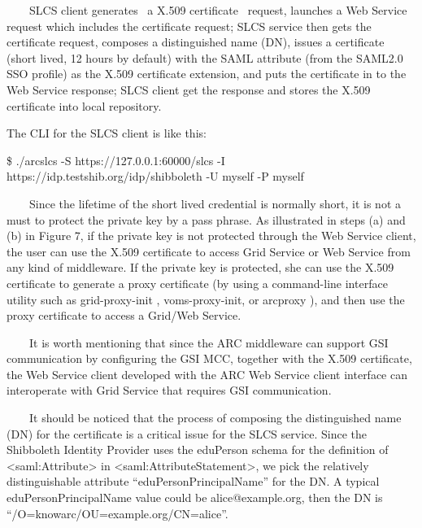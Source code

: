 \documentclass{article}
\newcounter{Figure}
\begin{document}
{\color{black}
\ \ \ \ SLCS client generates \ a X.509 certificate \ request, launches
a Web Service request which includes the certificate request; SLCS
service then gets the certificate request, composes a distinguished
name (DN), issues a certificate (short lived, 12 hours by default) with
the SAML attribute (from the SAML2.0 SSO profile) as the X.509
certificate extension, and puts the certificate in to the Web Service
response; SLCS client get the response and stores the X.509 certificate
into local repository.}

{\color{black}
The CLI for the SLCS client is like this:}

{\ttfamily\color{black}
\$ ./arcslcs -S https://127.0.0.1:60000/slcs -I
https://idp.testshib.org/idp/shibboleth -U myself -P myself}

{\color{black}
\ \ \ \ Since the lifetime of the short lived credential is normally
short, it is not a must to protect the private key by a pass phrase. As
illustrated in steps (a) and (b) in Figure 7, if the private key is not
protected through the Web Service client, the user can use the X.509
certificate to access Grid Service or Web Service from any kind of
middleware. If the private key is protected, she can use the X.509
certificate to generate a proxy certificate (by using a command-line
interface utility such as grid-proxy-init , voms-proxy-init, or
arcproxy ), and then use the proxy certificate to access a Grid/Web
Service.}

{\color{black}
\ \ \ \ It is worth mentioning that since the ARC middleware can support
GSI communication by configuring the GSI MCC, together with the X.509
certificate, the Web Service client developed with the ARC Web Service
client interface can interoperate with Grid Service that requires GSI
communication.}

{\color{black}
\ \ \ \ It should be noticed that the process of composing the
distinguished name (DN) for the certificate is a critical issue for the
SLCS service. Since the Shibboleth Identity Provider uses the eduPerson
schema for the definition of {\textless}saml:Attribute{\textgreater} in
{\textless}saml:AttributeStatement{\textgreater}, we pick the
relatively distinguishable attribute
{\textquotedblleft}eduPersonPrincipalName{\textquotedblright} for the
DN. A typical eduPersonPrincipalName value could be alice@example.org,
then the DN is
{\textquotedblleft}/O=knowarc/OU=example.org/CN=alice{\textquotedblright}.}
\end{document}
